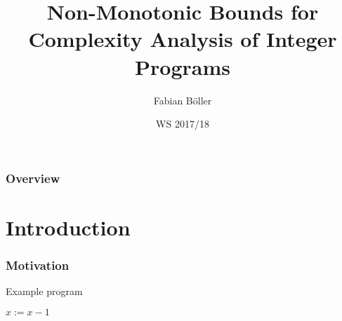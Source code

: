 \documentclass{beamer}
\title[Non-Monotonic Bounds for Complexity Analysis of Integer Programs]{Non-Monotonic Bounds for Complexity Analysis of Integer Programs}
\author{Fabian B\"{o}ller} %
\institute[i2] %
{
RWTH Aachen \\ %
\medskip
\textit{fabian.boeller@rwth-aachen.de} %
}
\date{WS 2017/18} %
\begin{document}
\begin{frame}
\titlepage %
\end{frame}

\begin{frame}
\frametitle{Overview} %
\tableofcontents %
\end{frame}


\section{Introduction}

\begin{frame}
  \frametitle{Motivation}
  \begin{block}{Example program}
    \begin{algorithmic}
        \State $x := x - 1$
      \EndWhile
    \end{algorithmic}
  \end{block}
\end{frame}
\end{document}
